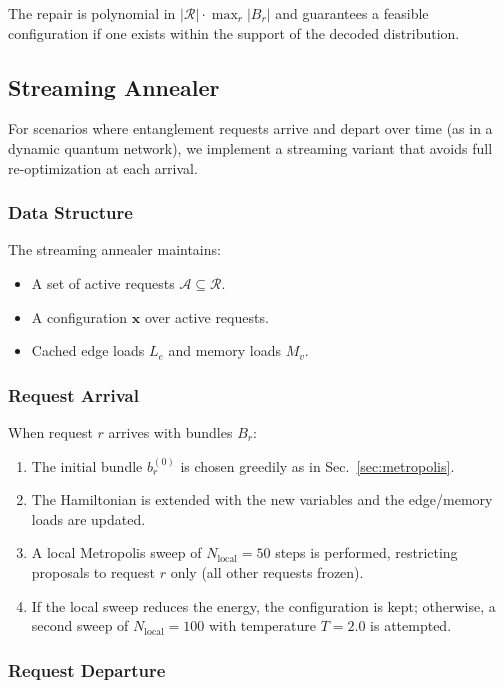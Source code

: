 \documentclass[10pt,a4paper]{article}
\begin{document}
The repair is polynomial in $|\mathcal{R}| \cdot \max_r |B_r|$ and
guarantees a feasible configuration if one exists within the support
of the decoded distribution.

\subsection{Streaming Annealer}
\label{sec:streaming}

For scenarios where entanglement requests arrive and depart over time
(as in a dynamic quantum network), we implement a streaming variant
that avoids full re-optimization at each arrival.

\subsubsection{Data Structure}

The streaming annealer maintains:
\begin{itemize}
  \item A set of active requests $\mathcal{A} \subseteq \mathcal{R}$.
  \item A configuration $\mathbf{x}$ over active requests.
  \item Cached edge loads $L_e$ and memory loads $M_v$.
\end{itemize}

\subsubsection{Request Arrival}

When request $r$ arrives with bundles $B_r$:
\begin{enumerate}
  \item The initial bundle $b_r^{(0)}$ is chosen greedily as in
    Sec.~\ref{sec:metropolis}.
  \item The Hamiltonian is extended with the new variables and the
    edge/memory loads are updated.
  \item A local Metropolis sweep of $N_{\text{local}} = 50$ steps
    is performed, restricting proposals to request $r$ only (all
    other requests frozen).
  \item If the local sweep reduces the energy, the configuration is
    kept; otherwise, a second sweep of $N_{\text{local}} = 100$ with
    temperature $T = 2.0$ is attempted.
\end{enumerate}

\subsubsection{Request Departure}
\end{document}
